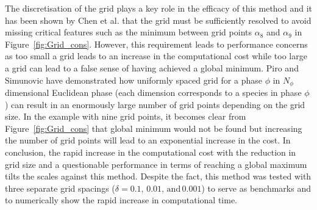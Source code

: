     The discretisation of the grid plays a key role in the efficacy of this method and it has been shown by Chen et al. \cite{Chen93b} that the grid must be sufficiently resolved to avoid missing critical features such as the minimum between grid points $\alpha_8$ and $\alpha_9$ in Figure~\ref{fig:Grid_cons}. However, this requirement leads to performance concerns as too small a grid leads to an increase in the computational cost while too large a grid can lead to a false sense of having achieved a global minimum.  Piro and Simunovic \cite{Piro16} have demonstrated how uniformly spaced grid for a phase $\phi$ in $N_\phi$ dimensional Euclidean phase (each dimension corresponds to a species in phase $\phi$) can result in an enormously large number of grid points depending on the grid size. In the example with nine grid points, it becomes clear from Figure~\ref{fig:Grid_cons} that global minimum would not be found but increasing the number of grid points will lead to an exponential increase in the cost. In conclusion, the rapid increase in the computational cost with the reduction in grid size and a questionable performance in terms of reaching a global maximum tilts the scales against this method. Despite the fact, this method was tested with three separate grid spacings ($\delta = 0.1, \, 0.01, \,\text{and}\, 0.001$) to serve as benchmarks and to numerically show the rapid increase in computational time.
	
